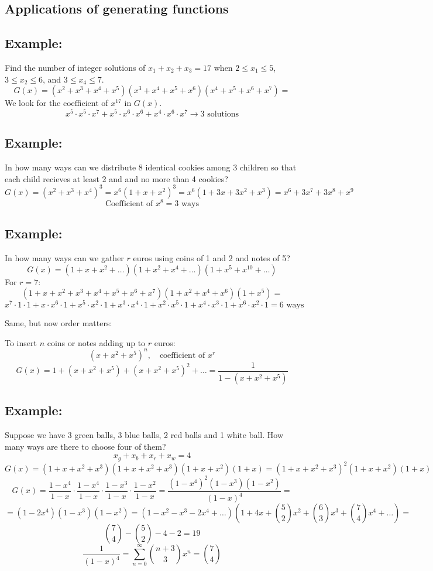 \documentclass[11pt]{article}
\begin{document}
\subsection{Applications of generating functions}
\subsection*{Example:}
Find the number of integer solutions of $x_1 + x_2 + x_3 = 17$ when $2 \leq x_1 \leq 5$, $3 \leq x_2 \leq 6$, and $3 \leq x_4 \leq 7$.
\[
G(x) = (x^2 + x^3 + x^4 + x^5)(x^3 + x^4 + x^5 + x^6)(x^4 + x^5 + x^6 + x^7) =
\]
We look for the coefficient of $x^{17}$ in $G(x)$.
\[
x^5 \cdot x^5 \cdot x^7 + x^5 \cdot x^6 \cdot x^6 + x^4 \cdot x^6 \cdot x^7 \rightarrow 3 \text{ solutions}
\]

\subsection*{Example:}
In how many ways can we distribute 8 identical cookies among 3 children so that each child recieves at least 2 and and no more than 4 cookies?
\[
G(x) = (x^2 + x^3 + x^4)^3 = x^6 (1 + x + x^2)^3 = x^6 (1 + 3x + 3x^2 + x^3) = x^6 + 3x^7 + 3x^8 + x^9
\]
\[
\text{Coefficient of } x^8 = 3 \text{ ways}
\]

\subsection*{Example:}
In how many ways can we gather $r$ euros using coins of 1 and 2 and notes of 5?
\[
G(x) = (1 + x + x^2 + \dots)(1 + x^2 + x^4 + \dots)(1 + x^5 + x^{10} + \dots) 
\]
For $r = 7$:
\[
(1 + x + x^2 + x^3 + x^4 + x^5 + x^6 + x^7)(1 + x^2 + x^4 + x^6)(1 + x^5) =
\]
\[
x^7 \cdot 1 \cdot 1 + x \cdot x^6 \cdot 1 + x^5 \cdot x^2 \cdot 1 + x^3 \cdot x^4 \cdot 1 + x^2 \cdot x^5 \cdot 1 + x^4 \cdot x^3 \cdot 1 + x^6 \cdot x^2 \cdot 1 = 6 \text{ ways}
\]

Same, but now order matters:

To insert $n$ coins or notes adding up to $r$ euros:
\[
(x + x^2 + x^5)^n, \quad \text{coefficient of } x^r
\]
\[
G(x) = 1 + (x + x^2 + x^5) + (x + x^2 + x^5)^2 + \dots = \frac{1}{1 - (x + x^2 + x^5)}
\]

\subsection*{Example:}
Suppose we have 3 green balls, 3 blue balls, 2 red balls and 1 white ball. How many ways are there to choose four of them?
\[
x_g + x_b + x_r + x_w = 4
\]
\[
G(x) = (1 + x + x^2 + x^3)(1 + x + x^2 + x^3)(1 + x + x^2) (1 + x) = (1 + x + x^2 + x^3)^2 (1 + x + x^2) (1 + x)
\]
\[
G(x) = \frac{1 - x^4}{1 - x} \cdot \frac{1 - x^4}{1 - x} \cdot \frac{1 - x^3}{1 - x} \cdot \frac{1 - x^2}{1 - x} = \frac{(1 - x^4)^2 (1 - x^3) (1 - x^2)}{(1 - x)^4} = 
\]
\[
= (1 - 2x^4)(1 - x^3)(1 - x^2) = (1 - x^2 - x^3 - 2x^4 + \dots)(1 + 4x + \binom{5}{2}x^2 + \binom{6}{3}x^3 + \binom{7}{4}x^4 + \dots) =
\]
\[
\binom{7}{4} - \binom{5}{2} - 4 - 2 = 19
\]
\[
\frac{1}{(1 - x)^4} = \sum_{n = 0}^{\infty} \binom{n + 3}{3} x^n = \binom{7}{4}
\]
\end{document}
